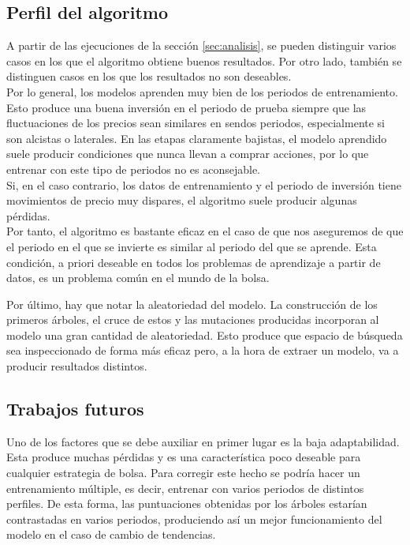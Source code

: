 \subsection{Perfil del algoritmo}

A partir de las ejecuciones de la secci\'on \ref{sec:analisis}, se pueden distinguir varios casos en los que el algoritmo obtiene buenos resultados. Por otro lado, tambi\'en se distinguen casos en los que los resultados no son deseables.\\

Por lo general, los modelos aprenden muy bien de los periodos de entrenamiento. Esto produce una buena inversi\'on en el periodo de prueba siempre que las fluctuaciones de los precios sean similares en sendos periodos, especialmente si son alcistas o laterales. En las etapas claramente bajistas, el modelo aprendido suele producir condiciones que nunca llevan a comprar acciones, por lo que entrenar con este tipo de periodos no es aconsejable.\\

Si, en el caso contrario, los datos de entrenamiento y el periodo de inversi\'on tiene movimientos de precio muy dispares, el algoritmo suele producir algunas p\'erdidas.\\

Por tanto, el algoritmo es bastante eficaz en el caso de que nos aseguremos de que el periodo en el que se invierte es similar al periodo del que se aprende. Esta condici\'on, a priori deseable en todos los problemas de aprendizaje a partir de datos, es un problema com\'un en el mundo de la bolsa.

Por \'ultimo, hay que notar la aleatoriedad del modelo. La construcci\'on de los primeros \'arboles, el cruce de estos y las mutaciones producidas incorporan al modelo una gran cantidad de aleatoriedad. Esto produce que espacio de b\'usqueda sea inspeccionado de forma m\'as eficaz pero, a la hora de extraer un modelo, va a producir resultados distintos.

\subsection{Trabajos futuros}

Uno de los factores que se debe auxiliar en primer lugar es la baja adaptabilidad. Esta produce muchas p\'erdidas y es una caracter\'istica poco deseable para cualquier estrategia de bolsa. Para corregir este hecho se podr\'ia hacer un entrenamiento m\'ultiple, es decir, entrenar con varios periodos de distintos perfiles. De esta forma, las puntuaciones obtenidas por los \'arboles estar\'ian contrastadas en varios periodos, produciendo as\'i un mejor funcionamiento del modelo en el caso de cambio de tendencias.\\

